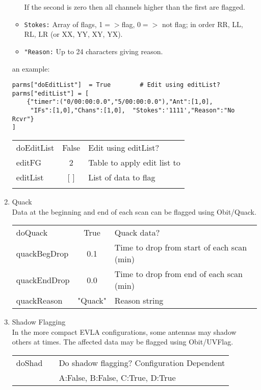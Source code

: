 \documentclass[11pt]{article}
\begin{document}
\begin{enumerate}
\begin{itemize}
If the second is zero then all channels higher than the first are flagged.
\item{\tt Stokes:} Array of flags, 1$=>$flag, $0=>$ not flag; in order
  RR, LL, RL, LR (or XX, YY, XY, YX).
\item{\tt "Reason:} Up to 24 characters giving reason.
\end{itemize}
an example:
\begin{verbatim}
parms["doEditList"]  = True        # Edit using editList?
parms["editList"] = [
    {"timer":("0/00:00:0.0","5/00:00:0.0"),"Ant":[1,0],
     "IFs":[1,0],"Chans":[1,0],  "Stokes":'1111',"Reason":"No Rcvr"}
]
\end{verbatim}

\begin{center}
\begin{tabular}{|l|c|l|}
\hline
doEditList  & False & Edit using editList? \\
editFG      & 2     & Table to apply edit list to\\
 editList   & [ ]   & List of data to flag \\
  &  &  \\
\hline
\end{tabular}
\end{center}
%
\item Quack\\
Data at the beginning and end of each scan can be flagged using
Obit/Quack. 
\begin{center}
\begin{tabular}{|l|c|l|}
\hline
doQuack       & True    & Quack data? \\
quackBegDrop  & 0.1     & Time to drop from start of each scan (min) \\
quackEndDrop  & 0.0     & Time to drop from end of each scan (min) \\
quackReason   & "Quack" & Reason string \\
\hline
\end{tabular}
\end{center}
%
\item Shadow Flagging \\
In the more compact EVLA configurations, some antennas may shadow
others at times.
The affected data may be flagged using Obit/UVFlag.
\begin{center}
\begin{tabular}{|l|c|l|}
\hline
doShad  &      & Do shadow flagging? Configuration Dependent \\
        &      & A:False, B:False, C:True, D:True\\

\end{tabular}
\end{center}
\end{enumerate}
\end{document}
